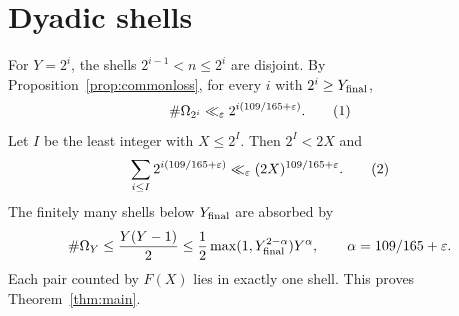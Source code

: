 \section{Dyadic shells}\label{sec:conclusion}

For \(Y=2^i\), the shells \(2^{i-1}<n\le2^i\) are disjoint. By
Proposition~\ref{prop:commonloss}, for every \(i\) with \(2^i\ge
Y_{\rm final}\),
\[
\#\Omega_{2^i}\ll_\varepsilon 2^{i(109/165+\varepsilon)}.
\AutoTag{eq:old:10_1}
\]
Let \(I\) be the least integer with \(X\le2^I\). Then \(2^I<2X\) and
\[
\sum_{i\le I}2^{i(109/165+\varepsilon)}
\ll_\varepsilon (2X)^{109/165+\varepsilon}.
\AutoTag{eq:old:10_2}
\]
The finitely many shells below \(Y_{\rm final}\) are absorbed by
\[
\#\Omega_Y\le \frac{Y(Y-1)}2
\le\frac12\max(1,Y_{\rm final}^{2-\alpha})Y^\alpha,
\qquad \alpha=109/165+\varepsilon.
\]
Each pair counted by \(F(X)\) lies in exactly one shell. This proves
Theorem~\ref{thm:main}.
